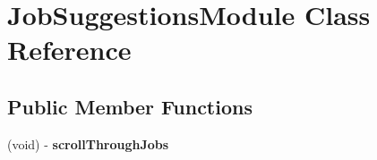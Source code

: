 \hypertarget{interface_job_suggestions_module}{
\section{\-Job\-Suggestions\-Module \-Class \-Reference}
\label{interface_job_suggestions_module}
}
\subsection*{\-Public \-Member \-Functions}
\begin{DoxyCompactItemize}
\item 
\hypertarget{interface_job_suggestions_module_a7c81667283b1a73ee5d0ed4d2adedcc8}{
(void) -\/ {\bfseries scroll\-Through\-Jobs}}
\label{interface_job_suggestions_module_a7c81667283b1a73ee5d0ed4d2adedcc8}

\end{DoxyCompactItemize}
